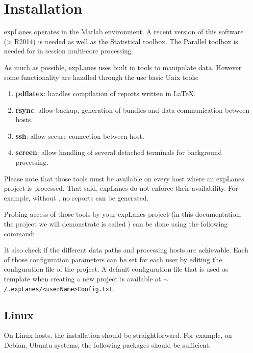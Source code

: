 \documentclass[a4paper,fleqn]{tufte-handout}
\newcommand{\explanes}{\textsf{expLanes} }
\begin{document}
\section{Installation}

\explanes operates in the Matlab environment. A recent version of this software (> R2014) is needed as well as the Statistical toolbox. The Parallel toolbox is needed for in session multi-core processing. 

As much as possible, \explanes uses built in tools to manipulate data. However some functionality are handled through the use basic Unix tools:
\begin{enumerate}
\item \textbf{pdflatex}: handles compilation of reports written in \LaTeX.
\item \textbf{rsync}: allow backup, generation of bundles and data communication between hosts.
\item \textbf{ssh}: allow secure connection between host.
\item \textbf{screen}: allow handling of several detached terminals for background processing.
\end{enumerate}
Please note that those tools must be available on every host where an \explanes project is processed. That said, \explanes do not enforce their availability. For example, without , no reports can be generated.

Probing access of those tools by your \explanes project (in this documentation, the project we will demonstrate is called ) can be done using the following command:


It also check if the different data paths and processing hosts are achievable. Each of those configuration parameters can be set for each user by editing the configuration file of the project. A default configuration file that is used as template when creating a new project is available at \texttt{$\sim$/.expLanes/<userName>Config.txt}.

\subsection{Linux}

On Linux hosts, the installation should be straightforward. For example, on Debian, Ubuntu systems, the following packages should be sufficient:

\end{document}
